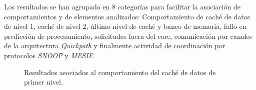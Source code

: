 Los resultados se han agrupado en 8 categorías para facilitar la asociación de comportamientos y de elementos analizados: Comportamiento de caché de datos de nivel 1, caché de nivel 2, último nivel de caché y banco de memoria, fallo en predicción de procesamiento, solicitudes fuera del core, comunicación por canales de la arquitectura \emph{Quickpath} y finalmente actividad de coordinación por protocolos \emph{SNOOP} y \emph{MESIF}.

\begin{figure}[ph!]
\centering
{}
\caption{Resultados asociados al comportamiento del caché de datos de primer nivel.}
\label{fig:pcounterL1}
\end{figure}

